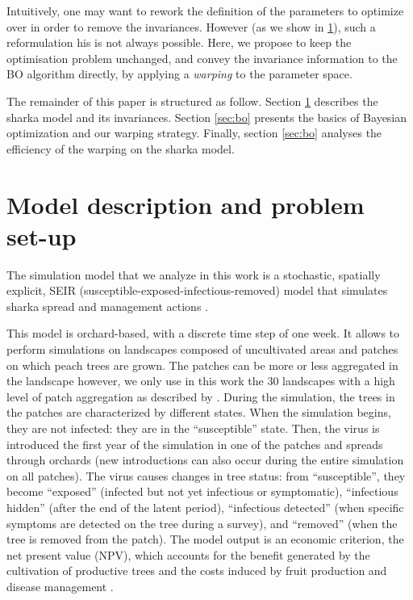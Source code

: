 Intuitively, one may want to rework the definition of the parameters to optimize over in order
to remove the invariances. However (as we show in \ref{sec:model}), such a reformulation his is not always possible.
Here, we propose to keep the optimisation problem unchanged, and convey the invariance information to the BO algorithm directly, by applying 
a \textit{warping} \cite{snelson2004warped,snoek2014input} to the parameter space.

The remainder of this paper is structured as follow. Section \ref{sec:model} describes the sharka model and its invariances.
Section \ref{sec:bo} presents the basics of Bayesian optimization and our warping strategy. Finally, section \ref{sec:bo}
analyses the efficiency of the warping on the sharka model.

\section{Model description and problem set-up}\label{sec:model}

The simulation model that we analyze in this work is a stochastic, spatially explicit, SEIR (susceptible-exposed-infectious-removed) model that simulates sharka spread and management actions 
\citep[including surveillance, removals and replantations][]{pleydell2018estimation,rimbaud2018using,rimbaud2018heuristic}.

This model is orchard-based, with a discrete time step of one week. It allows to perform simulations on landscapes composed of uncultivated areas and patches on which peach trees are grown. 
The patches can be more or less aggregated in the landscape however, we only use in this work the 30 landscapes with a high level of patch aggregation as described by \cite{picard2018}. 
During the simulation, the trees in the patches are characterized by different states. When the simulation begins, they are not infected: they are in the ``susceptible'' state. 
Then, the virus is introduced the first year of the simulation in one of the patches and spreads through orchards (new introductions can also occur during the entire simulation on all patches).
 The virus causes changes in tree status: from ``susceptible'', they become ``exposed'' (infected but not yet infectious or symptomatic), ``infectious hidden'' (after the end of the latent period), 
 ``infectious detected'' (when specific symptoms are detected on the tree during a survey), and ``removed'' (when the tree is removed from the patch). 
The model output is an economic criterion, the net present value (NPV), which accounts for the benefit generated by the cultivation of productive trees 
and the costs induced by fruit production and disease management \cite{rimbaud2018heuristic}.

